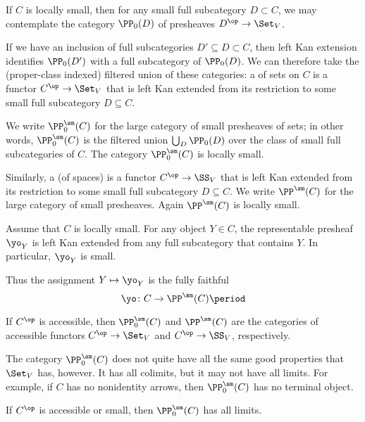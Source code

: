 \begin{definition}
	If $ C $ is locally small, then for any small full subcategory $ D \subset C $,
	we may contemplate the category $ \PP_0(D) $ of presheaves $ D^{\op} \to \Set_V $.

	If we have an inclusion of full subcategories $ D' \subseteq D \subset C $, then left Kan extension identifies
	$ \PP_0(D') $ with a full subcategory of $ \PP_0(D) $.
	We can therefore take the (proper-class indexed) filtered union of these categories:
	a  of sets on $ C $ is a functor $ C^{\op} \to \Set_V $
	that is left Kan extended from its restriction to some small full subcategory $ D \subseteq C $.
	
	We write $ \PP^{\sm}_0(C) $ for the large category of small presheaves of sets;
	in other words, $ \PP^{\sm}_0(C) $ is the filtered union $ \bigcup_D \PP_0(D) $
	over the class of small full subcategories of $ C $.
	The category $ \PP^{\sm}_0(C) $ is locally small.

	Similarly, a  (of spaces) is a functor $ C^{\op} \to \SS_V $
	that is left Kan extended from its restriction to some small full subcategory $ D \subseteq C $.
	We write $ \PP^{\sm}(C) $ for the large category of small presheaves.
	Again $ \PP^{\sm}(C) $ is locally small.
\end{definition}

\begin{eg}
	Assume that $ C $ is locally small.
	For any object $ Y \in C $,
	the representable presheaf $ \yo_Y $ is left Kan extended
	from any full subcategory that contains $ Y $.
	In particular, $ \yo_Y $ is small.

	Thus the assignment $ Y \mapsto \yo_Y $ is
	the fully faithful 
	\[
		\yo \colon C \to \PP^{\sm}(C) \period
	\]
\end{eg}

\begin{eg}
	If $ C^{\op} $ is accessible,
	then $ \PP^{\sm}_0(C) $ and $ \PP^{\sm}(C) $
	are the categories of accessible functors
	$ C^{\op} \to \Set_V $ and $ C^{\op} \to \SS_V $, respectively.
\end{eg}

\begin{nul}
	The category $ \PP^{\sm}_0(C) $ does not quite have
	all the same good properties that $ \Set_V $ has, however.
	It has all colimits, but it may not have all limits.
	For example, if $C$ has no nonidentity arrows, then
	$ \PP^{\sm}_0(C) $ has no terminal object.
	
	If $ C^{\op} $ is accessible or small,
	then $ \PP^{\sm}_0(C) $ has all limits.
\end{nul}

